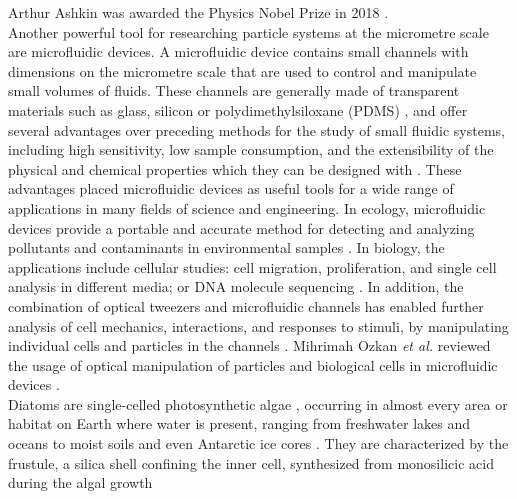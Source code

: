 \documentclass[letterpaper,12pt,oneside]{book}
\begin{document}
Arthur Ashkin was awarded the Physics Nobel Prize in 2018 \cite{NobelPrizeAsh}.\\ \indent
Another powerful tool for researching particle systems at the micrometre scale are microfluidic devices. A microfluidic device contains small channels with dimensions on the micrometre scale that are used to control and manipulate small volumes of fluids. These channels are generally made of transparent materials such as glass, silicon or polydimethylsiloxane (PDMS) \cite{nielsen2019microfluidics}, and offer several advantages over preceding methods for the study of small fluidic systems, including  high sensitivity, low sample consumption, and the extensibility of the physical and chemical properties which they can be designed with %
 \cite{chin2012commercialization}. These advantages placed microfluidic devices as useful tools for a wide range of applications in many fields of science and engineering. In ecology, microfluidic devices provide a portable and accurate method for detecting and analyzing pollutants and contaminants in environmental samples \cite{marle2005microfluidicenviromental}. In biology, the applications include cellular studies: cell migration, proliferation, and single cell analysis in different media; or DNA molecule sequencing \cite{paegel2003microfluidicDNA}. In addition, the combination of optical tweezers and microfluidic channels has enabled further analysis of cell mechanics, interactions, and responses to stimuli, by manipulating individual cells and particles in the channels \cite{wang2011enhancedmicroandopti}. Mihrimah Ozkan \textit{et al.} reviewed the usage of optical manipulation of particles and biological cells in microfluidic devices \cite{ozkan2003opticalandmicrofluidicsreview}. 
\\\indent Diatoms are single-celled photosynthetic algae \cite{round1990diatoms}, occurring in
almost every area or habitat on Earth where water is present, ranging from freshwater
lakes and oceans \cite{diatomworld} to moist soils and even Antarctic ice cores \cite{iceladregional}. They are characterized by the frustule, a silica shell confining the inner cell,  synthesized from monosilicic acid during the algal growth 
\end{document}
